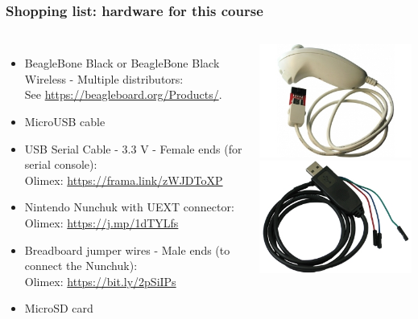 \begin{frame}
\frametitle{Shopping list: hardware for this course}
  \begin{columns}
    \footnotesize
    \begin{itemize}
    \item BeagleBone Black or BeagleBone Black Wireless - Multiple distributors: \\
      See \url{https://beagleboard.org/Products/}.
    \item MicroUSB cable
    \item USB Serial Cable - 3.3 V - Female ends (for serial console): \\
      Olimex: \url{https://frama.link/zWJDToXP}
    \item Nintendo Nunchuk with UEXT connector: \\
      Olimex: \url{https://j.mp/1dTYLfs}
    \item Breadboard jumper wires - Male ends (to connect the Nunchuk): \\
      Olimex: \url{https://bit.ly/2pSiIPs}
    \item MicroSD card
    \end{itemize}
    \includegraphics[height=0.25\textheight]{common/nunchuk.jpg} \\
    \includegraphics[height=0.20\textheight]{common/usb-serial-cable-female.png} \\

\end{columns}
\end{frame}
